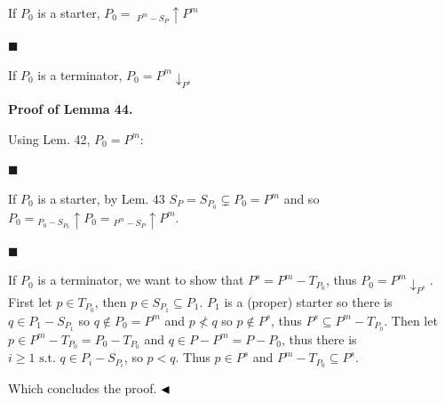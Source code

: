 If $P_{0}$ is a starter, $P_{0}=\ {}_{P^{m}-S_{P}\!}{\uparrow}{P^{m}}$\par
 
 
 
\par\noindent  $\blacksquare$ 
 
If $P_{0}$ is a terminator, $P_{0}={P^{m}}{\downarrow}_{P^{s}}$\par
 
 
  
 
 
 
 
\par\medskip\noindent\textbf{Proof of Lemma 44.}\par
 
 
Using Lem. 42, $P_{0}=P^{m}$:\par
  
\par\noindent  $\blacksquare$ 
 
If $P_{0}$ is a starter, by Lem. 43 $S_{P}=S_{P_{0}}\subsetneq P_{0}=P^{m}$ and so $P_{0}={}_{P_{0}-S_{P_{0}}\!}{\uparrow}{P_{0}}={}_{P^{m}-S_{P}\!}{\uparrow}{P^{m}}$.\par
 
 
 
\par\noindent  $\blacksquare$ 
 
If $P_{0}$ is a terminator, we want to show that $P^{s}=P^{m}-T_{P_{0}}$, thus $P_{0}={P^{m}}{\downarrow}_{P^{s}}$. First let $p\in T_{P_{0}}$, then $p\in S_{P_{1}}\subseteq P_{1}$. $P_{1}$ is a (proper) starter so there is $q\in P_{1}-S_{P_{1}}$ so $q\not\in P_{0}=P^{m}$ and $p\not<q$ so $p\not\in P^{s}$, thus $P^{s}\subseteq P^{m}-T_{P_{0}}$. Then let $p\in P^{m}-T_{P_{0}}=P_{0}-T_{P_{0}}$ and $q\in P-P^{m}=P-P_{0}$, thus there is $i\geqslant 1\text{ s.t.\ }q\in P_{i}-S_{P_{i}}$, so $p<q$. Thus $p\in P^{s}$ and $P^{m}-T_{P_{0}}\subseteq P^{s}$.\par
 
 
  
Which concludes the proof. $\hfill\blacktriangleleft$\par
 
